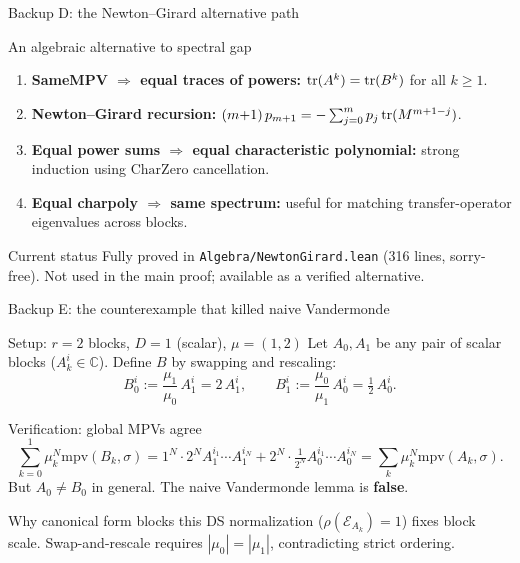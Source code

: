 \documentclass[aspectratio=169,10pt]{beamer}
\newcommand{\cE}{\mathcal{E}}
\begin{document}
\begin{frame}{Backup D: the Newton--Girard alternative path}
    \vspace{-0.6em}

    \begin{block}{An algebraic alternative to spectral gap}
        \begin{enumerate}\itemsep0.1em
            \item \textbf{SameMPV $\Rightarrow$ equal traces of powers:}
                  $\mathrm{tr}(A^k) = \mathrm{tr}(B^k)$ for all $k\ge 1$.
            \item \textbf{Newton--Girard recursion:}
                  $(m{+}1)\,p_{m+1}=-\sum_{j=0}^{m} p_j\,\mathrm{tr}(M^{m+1-j})$.
            \item \textbf{Equal power sums $\Rightarrow$ equal characteristic polynomial:}
                  strong induction using $\mathrm{CharZero}$ cancellation.
            \item \textbf{Equal charpoly $\Rightarrow$ same spectrum:} useful for matching
                  transfer-operator eigenvalues across blocks.
        \end{enumerate}
    \end{block}

    \begin{block}{Current status}
        Fully proved in \texttt{Algebra/NewtonGirard.lean} (316 lines, sorry-free).
        Not used in the main proof; available as a verified alternative.
    \end{block}
\end{frame}

\begin{frame}{Backup E: the counterexample that killed naive Vandermonde}
    \vspace{-0.6em}

    \begin{block}{Setup: $r=2$ blocks, $D=1$ (scalar), $\mu=(1,2)$}
        Let $A_0, A_1$ be any pair of scalar blocks ($A_k^i \in \mathbb{C}$).
        Define $B$ by swapping and rescaling:
        \[
            B_0^i := \frac{\mu_1}{\mu_0}\,A_1^i = 2\,A_1^i,
            \qquad
            B_1^i := \frac{\mu_0}{\mu_1}\,A_0^i = \tfrac{1}{2}\,A_0^i.
        \]
    \end{block}

    \begin{block}{Verification: global MPVs agree}
        \vspace{-0.5em}
        \[
            \sum_{k=0}^{1} \mu_k^N \mathrm{mpv}(B_k,\sigma)
            = 1^N \cdot 2^N A_1^{i_1}\cdots A_1^{i_N}
            + 2^N \cdot \tfrac{1}{2^N} A_0^{i_1}\cdots A_0^{i_N}
            = \sum_{k} \mu_k^N \mathrm{mpv}(A_k,\sigma).
        \]
        But $A_0 \neq B_0$ in general. The naive Vandermonde lemma is \textbf{false}.
    \end{block}

    \begin{block}{Why canonical form blocks this}
        DS normalization ($\rho(\cE_{A_k})=1$) fixes block scale.
        Swap-and-rescale requires $|\mu_0|=|\mu_1|$, contradicting strict ordering.
    \end{block}
\end{frame}
\end{document}
